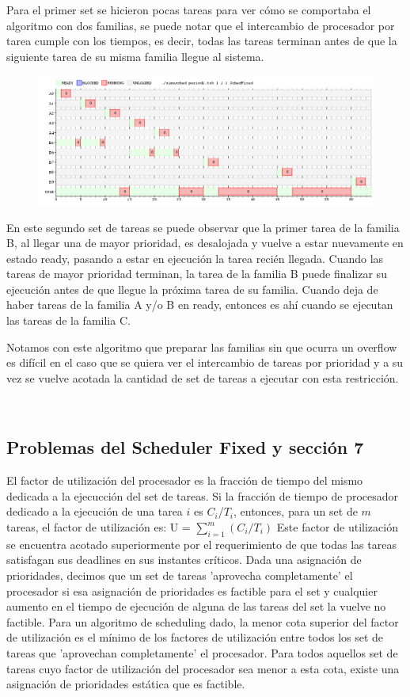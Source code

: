 Para el primer set se hicieron pocas tareas para ver cómo se comportaba el algoritmo con dos familias, se puede notar que el intercambio de procesador por tarea cumple con los tiempos, es decir, todas las tareas terminan antes de que la siguiente tarea de su misma familia llegue al sistema.

\begin{figure}[H]
  \centering
\includegraphics[scale=0.45]{fixed/period1.png}
  \caption[test 2]{}
\end{figure}

En este segundo set de tareas se puede observar que la primer tarea de la familia B, al llegar una de mayor prioridad, es desalojada y vuelve a estar nuevamente en estado ready, pasando a estar en ejecución la tarea recién llegada. Cuando las tareas de mayor prioridad terminan, la tarea de la familia B puede finalizar su ejecución antes de que llegue la próxima tarea de su familia. Cuando deja de haber tareas de la familia A y/o B en ready, entonces es ahí cuando se ejecutan las tareas de la familia C.

Notamos con este algoritmo que preparar las familias sin que ocurra un overflow es difícil en el caso que se quiera ver el intercambio de tareas por prioridad y a su vez se vuelve acotada la cantidad de set de tareas a ejecutar con esta restricción.

\\

\subsection{Problemas del Scheduler Fixed y sección 7}
El factor de utilización del procesador es la fracción de tiempo del mismo dedicada a la ejecucción del set de tareas. Si la fracción de tiempo de procesador dedicado a la ejecución de una tarea $i$ es $C_i$/$T_i$, entonces, para un set de $m$ tareas, el factor de utilización es:
 U = $\sum_{i=1}^{m} (C_{i}/T_{i})$
Este factor de utilización se encuentra acotado superiormente por el requerimiento de que todas las tareas satisfagan sus deadlines en sus instantes críticos. Dada una asignación de prioridades, decimos que un set de tareas 'aprovecha completamente' el procesador si esa asignación de prioridades es factible para el set y cualquier aumento en el tiempo de ejecución de alguna de las tareas del set la vuelve no factible. Para un algoritmo de scheduling dado, la menor cota superior del factor de utilización es el mínimo de los factores de utilización entre todos los set de tareas que 'aprovechan completamente' el procesador. Para todos aquellos set de tareas cuyo factor de utilización del procesador sea menor a esta cota, existe una asignación de prioridades estática que es factible.


